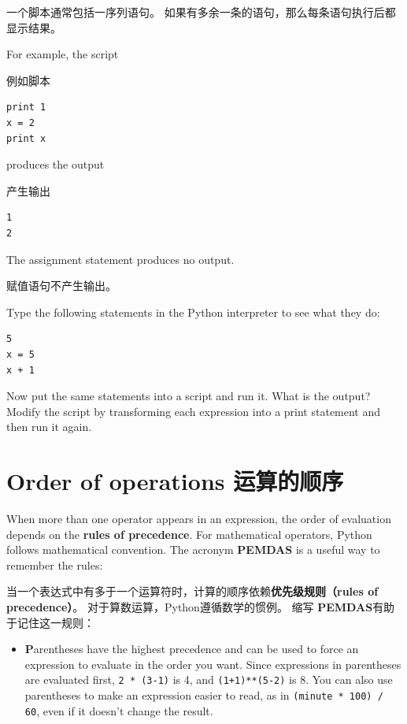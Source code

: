 \documentclass[10pt]{book}
\begin{document}
\begin{CJK}{UTF8}{gbsn}
一个脚本通常包括一序列语句。
如果有多余一条的语句，那么每条语句执行后都显示结果。

For example, the script

例如脚本

\begin{verbatim}
print 1
x = 2
print x
\end{verbatim}
%
produces the output

产生输出

\begin{verbatim}
1
2
\end{verbatim}
%
The assignment statement produces no output.

赋值语句不产生输出。

\begin{exercise}

Type the following statements in the Python interpreter to see
what they do:

\begin{verbatim}
5
x = 5
x + 1
\end{verbatim}
%
Now put the same statements into a script and run it.  What
is the output?  Modify the script by transforming each
expression into a print statement and then run it again.
\end{exercise}


\section{Order of operations 运算的顺序}

When more than one operator appears in an expression, the order of
evaluation depends on the {\bf rules of precedence}.  For
mathematical operators, Python follows mathematical convention.
The acronym {\bf PEMDAS} is a useful way to
remember the rules:

当一个表达式中有多于一个运算符时，计算的顺序依赖{\bf 优先级规则（rules of precedence）}。
对于算数运算，Python遵循数学的惯例。
缩写 {\bf PEMDAS}有助于记住这一规则：

\begin{itemize}

\item {\bf P}arentheses have the highest precedence and can be used 
to force an expression to evaluate in the order you want. Since
expressions in parentheses are evaluated first, {\tt 2 * (3-1)} is 4,
and {\tt (1+1)**(5-2)} is 8. You can also use parentheses to make an
expression easier to read, as in {\tt (minute * 100) / 60}, even
if it doesn't change the result.


\end{itemize}
\end{CJK}
\end{document}
